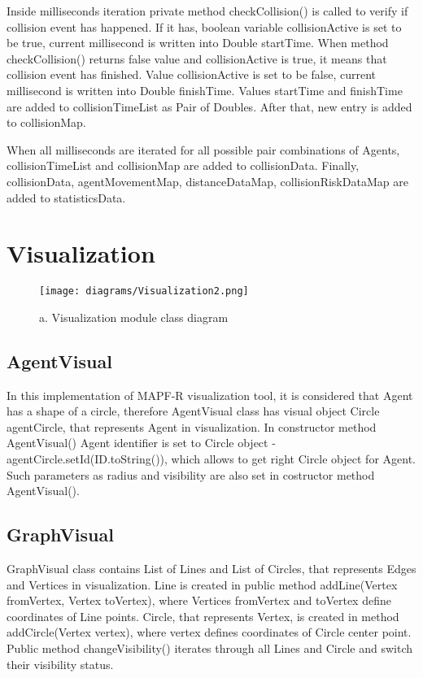 \documentclass[thesis=B,english]{FITthesis}[2019/12/23]
\begin{document}
Inside milliseconds iteration private method checkCollision() is called to verify if collision event has happened. If it has, boolean variable collisionActive is set to be true, current millisecond is written into Double startTime. When method checkCollision() returns false value and collisionActive is true, it means that collision event has finished. Value collisionActive is set to be false, current millisecond is written into Double finishTime. Values startTime and finishTime are added to collisionTimeList as Pair of Doubles. After that, new entry is added to collisionMap. 

When all milliseconds are iterated for all possible pair combinations of Agents, 
collisionTimeList and collisionMap are added to collisionData. Finally,
collisionData, agentMovementMap, distanceDataMap, collisionRiskDataMap are added to statisticsData.

\section{Visualization}

\begin{figure}
	\texttt{[image: diagrams/Visualization2.png]}
	\caption[a. Visualization module class diagram]{a. Visualization module class diagram}\label{fig:float15}
\end{figure}


\subsection{AgentVisual}

In this implementation of MAPF-R visualization tool, it is considered that Agent has a shape of a circle, therefore AgentVisual class has visual object Circle agentCircle, that represents Agent in visualization. In constructor method AgentVisual() Agent identifier is set to Circle object - agentCircle.setId(ID.toString()), which allows to get right Circle object for Agent. Such parameters as radius and visibility are also set in costructor method AgentVisual().

\subsection{GraphVisual}
GraphVisual class contains List of Lines and List of Circles, that represents Edges and Vertices in visualization. Line is created in public method addLine(Vertex fromVertex, Vertex toVertex), where Vertices fromVertex and toVertex define coordinates of Line points. Circle, that represents Vertex, is created in method addCircle(Vertex vertex), where vertex defines coordinates of Circle center point. Public method changeVisibility() iterates through all Lines and Circle and switch their visibility status.           
\end{document}
